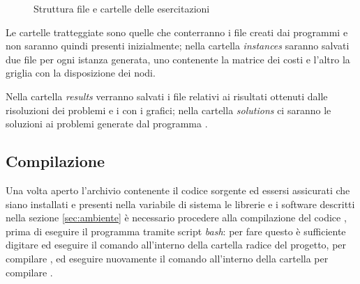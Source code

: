 \begin{figure}[htb]
\centering

\caption{Struttura file e cartelle delle esercitazioni}
\label{fig:struttura}
\end{figure}

Le cartelle tratteggiate sono quelle che conterranno i file creati dai programmi e non saranno quindi presenti inizialmente; nella cartella \emph{instances} saranno salvati due file per ogni istanza generata, uno contenente la matrice dei costi e l'altro la griglia con la disposizione dei nodi.

Nella cartella \emph{results} verranno salvati i file relativi ai risultati ottenuti dalle risoluzioni dei problemi e i  con i grafici; nella cartella \emph{solutions} ci saranno le soluzioni ai problemi generate dal programma .

\subsection{Compilazione}
Una volta aperto l'archivio contenente il codice sorgente ed essersi assicurati che siano installati e presenti nella variabile di sistema  le librerie e i software descritti nella sezione \ref{sec:ambiente} è necessario procedere alla compilazione del codice , prima di eseguire il programma tramite script \emph{bash}: per fare questo è sufficiente digitare ed eseguire il comando  all'interno della cartella radice del progetto, per compilare , ed eseguire nuovamente il comando  all'interno della cartella  per compilare .


